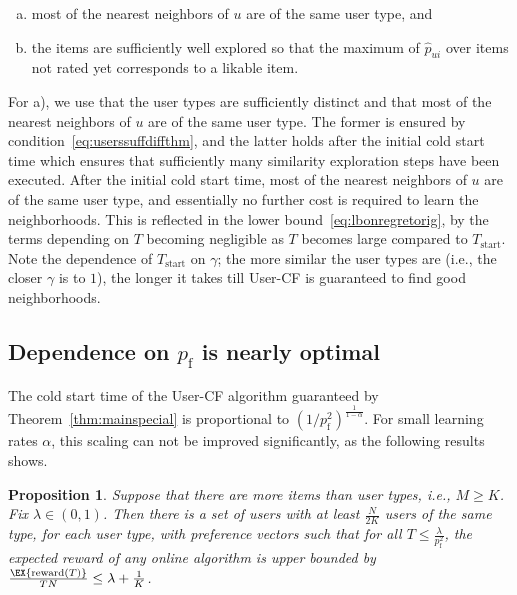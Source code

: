 \documentclass{article}
\newcommand\arewardT{\EX{\mathrm{reward}(T)}}
\newtheorem{proposition}{Proposition}
\newcommand\pf{p_{\mathrm{f}}}
\begin{document}
\vspace{-0.25cm}
\begin{enumerate}[a)]
\item most of the nearest neighbors of $u$ are of the same user type, and 
\item the items are sufficiently well explored so that the maximum of $\hat p_{ui}$ over items not rated yet  corresponds to a likable item. 
\end{enumerate}
\vspace{-0.25cm}


For a), we use that the user types are sufficiently distinct and that most of the nearest neighbors of $u$ are of the same user type. 
The former is ensured by condition~\eqref{eq:userssuffdiffthm}, and the latter holds after the initial cold start time which ensures that sufficiently many similarity exploration steps have been executed. 
After the initial cold start time, most of the nearest neighbors of $u$ are of the same user type, and 
essentially no further cost is required to learn the  neighborhoods. 
This is reflected in the lower bound~\eqref{eq:lbonregretorig}, by the terms depending on $T$ becoming negligible as $T$ becomes large compared to $T_{\text{start}}$. 
Note the dependence of $T_{\text{start}}$ on $\gamma$; the more similar the user types are (i.e., the closer $\gamma$ is to $1$), the longer it takes till User-CF is guaranteed to find good neighborhoods. 

\vspace{-0.2cm}
\subsection{Dependence on $\pf$ is nearly optimal}
\vspace{-0.2cm}


The cold start time of the User-CF algorithm guaranteed by Theorem~\ref{thm:mainspecial} is proportional to $(1/\pf^2)^{\frac{1}{1-\alpha}}$. 
For small learning rates $\alpha$, this scaling can not be improved significantly, as the following results shows.

\begin{proposition}
\label{prop:necessity}
Suppose that there are more items than user types, i.e., $M \geq K$. 
Fix $\lambda \in (0,1)$. 
Then there is a set of users with at least $\frac{N}{2K}$ users of the same type, for each user type, 
with preference vectors such that for all 
$T \leq \frac{\lambda}{\pf^2}$, 
the expected reward of any online algorithm is upper bounded by 
$\frac{\arewardT}{TN} \leq \lambda + \frac{1}{K}$. 
\end{proposition}
 
\end{document}
